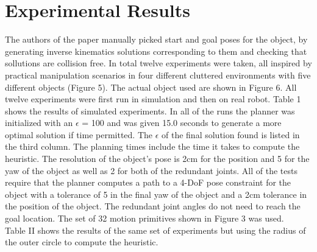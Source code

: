 \documentclass[11pt]{article}
\begin{document}
\section{Experimental Results}
The authors of the paper manually picked  start and goal poses for the object, by generating inverse kinematics solutions corresponding to them and checking that sollutions are collision free. In total twelve experiments were taken, all inspired by practical manipulation scenarios in four different cluttered environments with five different objects (Figure 5). The actual object used are shown in Figure 6. All twelve experiments were first run in simulation and then on real robot. Table 1 shows the results of simulated experiments. In all of the runs the planner was initialized with an $\epsilon$ = 100 and was given 15.0 seconds to generate a more optimal solution if time permitted. The $\epsilon$ of the final solution found is listed in the third column. The planning times include the time it takes to compute the heuristic. The resolution of the object's pose is 2cm for the position and 5 for the yaw of the object as well as 2 for both of the redundant joints. All of the tests require that the planner computes a path to a 4-DoF pose constraint for the object with a tolerance of 5 in the final yaw of the object and a 2cm tolerance in the position of the object. The redundant joint angles do not need to reach the goal location. The set of 32 motion primitives shown in Figure 3 was used.\\
Table II shows the results of the same set of experiments but using the radius of the outer circle to compute the heuristic.\\
\end{document}
